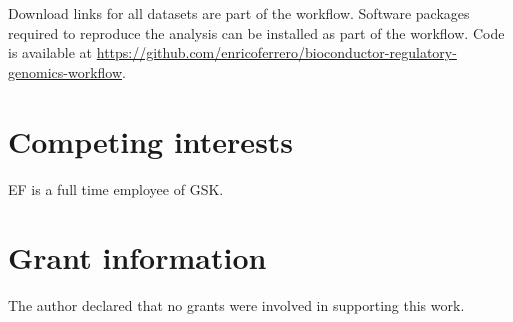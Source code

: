 \documentclass[9pt,a4paper,]{extarticle}
\begin{document}
Download links for all datasets are part of the workflow.
Software packages required to reproduce the analysis can be installed as part of the workflow.
Code is available at \url{https://github.com/enricoferrero/bioconductor-regulatory-genomics-workflow}.

\section{Competing interests}\label{competing-interests}

EF is a full time employee of GSK.

\section{Grant information}\label{grant-information}

The author declared that no grants were involved in supporting this work.

\renewcommand\refname{References}
{\small}
\end{document}
